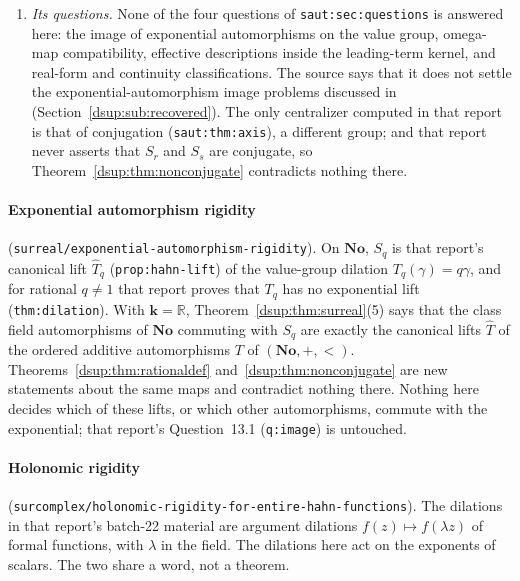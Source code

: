 \documentclass[11pt,oneside]{article}
\numberwithin{equation}{section}
\theoremstyle{definition}
\theoremstyle{remark}
\newcommand{\No}{\mathbf{No}}
\newcommand{\R}{\mathbb R}
\newcommand{\C}{\mathbb C}
\newcommand{\kk}{\mathbf k}
\newcommand{\repo}[1]{\nolinkurl{#1}}%
\newcommand{\lbl}[1]{\nolinkurl{#1}}%
\begin{document}
\begin{enumerate}[leftmargin=*,itemsep=3pt]
Theorem~\ref{dsup:thm:surreal}(4) show that after adding the single
automorphism $S_q$ the coefficient field, the monomials, every coefficient
and the valuation ring become parameter-free definable. The expansion is a
different structure, so the two results are complementary. On $\No(i)$ the
real axis $\No$ is still not claimed definable, and the centralizer
contains every automorphism of $\C$ (Section~\ref{dsup:sub:recovered}).
\item \emph{Its questions.} None of the four questions of
\lbl{saut:sec:questions} is answered here: the image of exponential
automorphisms on the value group, omega-map compatibility, effective
descriptions inside the leading-term kernel, and real-form and continuity
classifications. The source says that it does not settle the
exponential-automorphism image problems discussed in \cite{KKS,RepoAut}
(Section~\ref{dsup:sub:recovered}). The only centralizer computed in that
report is that of conjugation (\lbl{saut:thm:axis}), a different group; and
that report never asserts that $S_r$ and $S_s$ are conjugate, so
Theorem~\ref{dsup:thm:nonconjugate} contradicts nothing there.
\end{enumerate}

\paragraph{Exponential automorphism rigidity}
(\repo{surreal/exponential-automorphism-rigidity}). On $\No$, $S_q$ is that
report's canonical lift $\widehat T_q$ (\lbl{prop:hahn-lift}) of the
value-group dilation $T_q(\gamma)=q\gamma$, and for rational $q\ne1$ that
report proves that $T_q$ has no exponential lift (\lbl{thm:dilation}). With
$\kk=\R$, Theorem~\ref{dsup:thm:surreal}(5) says that the class field
automorphisms of $\No$ commuting with $S_q$ are exactly the canonical lifts
$\widehat T$ of the ordered additive automorphisms $T$ of $(\No,+,<)$.
Theorems~\ref{dsup:thm:rationaldef} and~\ref{dsup:thm:nonconjugate} are new
statements about the same maps and contradict nothing there. Nothing here
decides which of these lifts, or which other automorphisms, commute with
the exponential; that report's Question~13.1 (\lbl{q:image}) is untouched.

\paragraph{Holonomic rigidity}
(\repo{surcomplex/holonomic-rigidity-for-entire-hahn-functions}). The
dilations in that report's batch-22 material are argument dilations
$f(z)\mapsto f(\lambda z)$ of formal functions, with $\lambda$ in the field.
The dilations here act on the exponents of scalars. The two share a word,
not a theorem.
\end{document}
